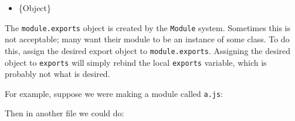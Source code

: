 \begin{itemize}
\tightlist
\item
  \{Object\}
\end{itemize}

The \texttt{module.exports} object is created by the \texttt{Module}
system. Sometimes this is not acceptable; many want their module to be
an instance of some class. To do this, assign the desired export object
to \texttt{module.exports}. Assigning the desired object to
\texttt{exports} will simply rebind the local \texttt{exports} variable,
which is probably not what is desired.

For example, suppose we were making a module called \texttt{a.js}:

\begin{Shaded}
\begin{Highlighting}[]
  \OperatorTok{=} \NormalTok{(}\NormalTok{)}\OperatorTok{;}

 \OperatorTok{=}  \NormalTok{()}\OperatorTok{;}

\NormalTok{(() }\KeywordTok{=\textgreater{}}\NormalTok{ \{}
\NormalTok{(}\NormalTok{)}\OperatorTok{;}
\NormalTok{\}}\OperatorTok{,} \NormalTok{)}\OperatorTok{;}
\end{Highlighting}
\end{Shaded}

Then in another file we could do:

\begin{Shaded}
\begin{Highlighting}[]
\OperatorTok{=} \NormalTok{(}\NormalTok{)}\OperatorTok{;}
\NormalTok{(}\OperatorTok{,}\NormalTok{ () }\KeywordTok{=\textgreater{}}\NormalTok{ \{}
  \NormalTok{(}\NormalTok{)}\OperatorTok{;}
\NormalTok{\})}\OperatorTok{;}
\end{Highlighting}
\end{Shaded}

